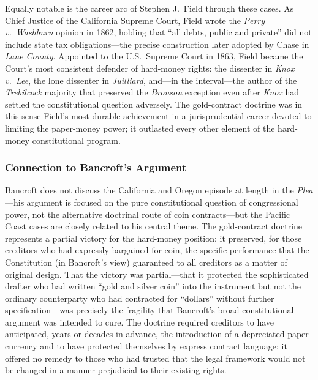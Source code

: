 \documentclass[12pt]{article}
\begin{document}
Equally notable is the career arc of Stephen J.\ Field through these
cases.  As Chief Justice of the California Supreme Court, Field wrote the
\textit{Perry v.\ Washburn} opinion in 1862, holding that ``all debts,
public and private'' did not include state tax obligations---the precise
construction later adopted by Chase in \textit{Lane County}.  Appointed to
the U.S.\ Supreme Court in 1863, Field became the Court's most consistent
defender of hard-money rights: the dissenter in \textit{Knox v.\ Lee}, the
lone dissenter in \textit{Juilliard}, and---in the interval---the author of
the \textit{Trebilcock} majority that preserved the \textit{Bronson}
exception even after \textit{Knox} had settled the constitutional question
adversely.  The gold-contract doctrine was in this sense Field's most
durable achievement in a jurisprudential career devoted to limiting the
paper-money power; it outlasted every other element of the hard-money
constitutional program.

\subsubsection*{Connection to Bancroft's Argument}

Bancroft does not discuss the California and Oregon episode at length in the
\textit{Plea}---his argument is focused on the pure constitutional question
of congressional power, not the alternative doctrinal route of coin
contracts---but the Pacific Coast cases are closely related to his central
theme.  The gold-contract doctrine represents a partial victory for the
hard-money position: it preserved, for those creditors who had expressly
bargained for coin, the specific performance that the Constitution (in
Bancroft's view) guaranteed to all creditors as a matter of original design.
That the victory was partial---that it protected the sophisticated drafter
who had written ``gold and silver coin'' into the instrument but not the
ordinary counterparty who had contracted for ``dollars'' without further
specification---was precisely the fragility that Bancroft's broad
constitutional argument was intended to cure.  The doctrine required
creditors to have anticipated, years or decades in advance, the introduction
of a depreciated paper currency and to have protected themselves by express
contract language; it offered no remedy to those who had trusted that the
legal framework would not be changed in a manner prejudicial to their
existing rights.
\end{document}
